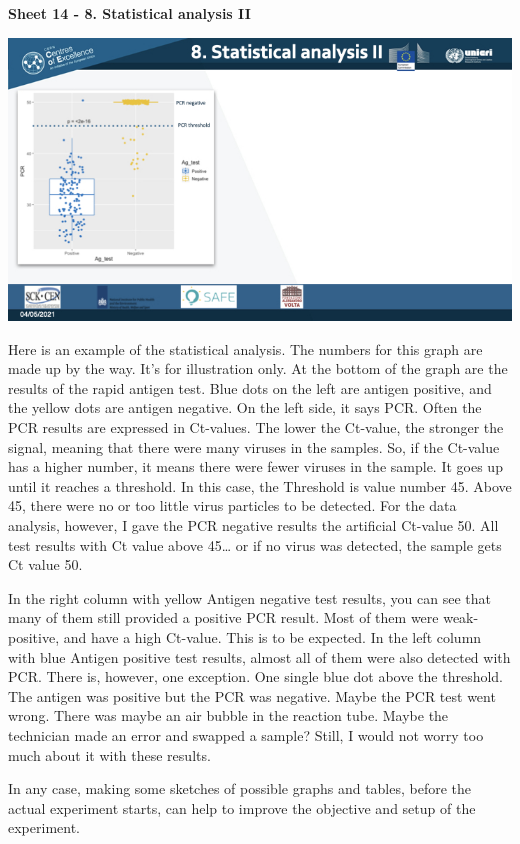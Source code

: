 \documentclass[
]{book}
\begin{document}
\textbf{Sheet 14 - 8. Statistical analysis II}

\includegraphics{images/m03/m03_validation_of_test_kits_v2_2.014.jpeg}

Here is an example of the statistical analysis. The numbers for this
graph are made up by the way. It's for illustration only.
At the bottom of the graph are the results of the rapid antigen test.
Blue dots on the left are antigen positive, and the yellow dots are
antigen negative. On the left side, it says PCR. Often the PCR results
are expressed in Ct-values. The lower the Ct-value, the stronger the
signal, meaning that there were many viruses in the samples. So, if the
Ct-value has a higher number, it means there were fewer viruses in the
sample. It goes up until it reaches a threshold. In this case, the
Threshold is value number 45. Above 45, there were no or too little
virus particles to be detected. For the data analysis, however, I gave
the PCR negative results the artificial Ct-value 50. All test results
with Ct value above 45\ldots{} or if no virus was detected, the sample gets
Ct value 50.

In the right column with yellow Antigen negative test results, you can
see that many of them still provided a positive PCR result. Most of them
were weak-positive, and have a high Ct-value. This is to be expected. In
the left column with blue Antigen positive test results, almost all of
them were also detected with PCR. There is, however, one exception. One
single blue dot above the threshold. The antigen was positive but the
PCR was negative. Maybe the PCR test went wrong. There was maybe an air
bubble in the reaction tube. Maybe the technician made an error and
swapped a sample? Still, I would not worry too much about it with these
results.

In any case, making some sketches of possible graphs and tables, before
the actual experiment starts, can help to improve the objective and
setup of the experiment.
\end{document}
